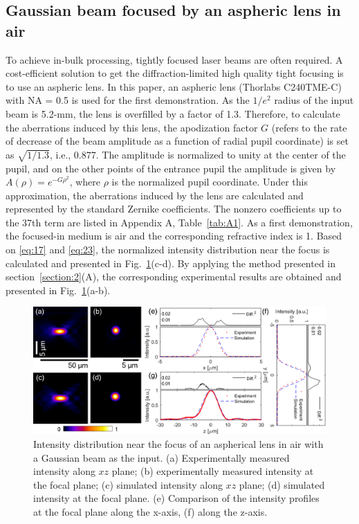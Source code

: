 \documentclass[9pt,twocolumn,twoside]{osajnl}
\begin{document}
\subsection{Gaussian beam focused by an aspheric lens in air}
To achieve in-bulk processing, tightly focused laser beams are often required. A cost-efficient solution to get the diffraction-limited high quality tight focusing is to use an aspheric lens. %
In this paper, an aspheric lens (Thorlabs C240TME-C) with NA = 0.5 is used for the first demonstration. As the $1/e^2$ radius of the input beam is 5.2-mm, the lens is overfilled by a factor of 1.3. Therefore, to calculate the aberrations induced by this lens, the apodization factor $G$ (refers to the rate of decrease of the beam amplitude as a function of radial pupil coordinate) is set as $\sqrt{1/1.3}$, i.e., 0.877. The amplitude is normalized to unity at the center of the pupil, and on the other points of the entrance pupil the amplitude is given by $A(\rho)=e^{-G\rho^2}$, where $\rho$ is the normalized pupil coordinate. Under this approximation, the aberrations induced by the lens are calculated and represented by the standard Zernike coefficients. The nonzero coefficients up to the 37th term are listed in Appendix A, Table~\ref{tab:A1}. As a first demonstration, the focused-in medium is air and the corresponding refractive index is 1. Based on \eqref{eq:17} and \eqref{eq:23}, the normalized intensity distribution near the focus is calculated and presented in Fig.~\ref{fig:3b}(c-d). By applying the method presented in section~\ref{section:2}(A), the corresponding experimental results are obtained and presented in Fig.~\ref{fig:3b}(a-b).  
\begin{figure}
	\centering
	\includegraphics[width=\linewidth]{../AppOptics/figures/C240TME-C.pdf}
	\caption{Intensity distribution near the focus of an aspherical lens in air with a Gaussian beam as the input. (a) Experimentally measured intensity along $xz$ plane; (b) experimentally measured intensity at the focal plane; (c) simulated intensity along $xz$ plane; (d) simulated intensity at the focal plane. (e) Comparison of the intensity profiles at the focal plane along the x-axis, (f) along the z-axis.}\label{fig:3b}
\end{figure}
\end{document}
